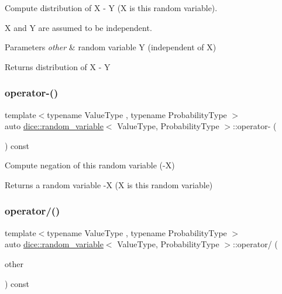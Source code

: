 Compute distribution of X -\/ Y (X is this random variable). 

X and Y are assumed to be independent.


\begin{DoxyParams}{Parameters}
{\em other} & random variable Y (independent of X)\\
\hline
\end{DoxyParams}
\begin{DoxyReturn}{Returns}
distribution of X -\/ Y 
\end{DoxyReturn}
\mbox{\label{classdice_1_1random__variable_a5900675092ca3ca0ea387628ed64624f}} 
\subsubsection{\texorpdfstring{operator-\/()}{operator-()}\hspace{0.1cm}{\footnotesize\ttfamily [2/2]}}
{\footnotesize\ttfamily template$<$typename Value\+Type , typename Probability\+Type $>$ \\
auto \mbox{\hyperlink{classdice_1_1random__variable}{dice\+::random\+\_\+variable}}$<$ Value\+Type, Probability\+Type $>$\+::operator-\/ (\begin{DoxyParamCaption}{ }\end{DoxyParamCaption}) const\hspace{0.3cm}{\ttfamily [inline]}}



Compute negation of this random variable (-\/X) 

\begin{DoxyReturn}{Returns}
a random variable -\/X (X is this random variable) 
\end{DoxyReturn}
\mbox{\label{classdice_1_1random__variable_a52896f8ba19758fc240d6e8f51b650e7}} 
\subsubsection{\texorpdfstring{operator/()}{operator/()}}
{\footnotesize\ttfamily template$<$typename Value\+Type , typename Probability\+Type $>$ \\
auto \mbox{\hyperlink{classdice_1_1random__variable}{dice\+::random\+\_\+variable}}$<$ Value\+Type, Probability\+Type $>$\+::operator/ (\begin{DoxyParamCaption}\item[{const \mbox{\hyperlink{classdice_1_1random__variable}{random\+\_\+variable}}$<$ Value\+Type, Probability\+Type $>$ \&}]{other }\end{DoxyParamCaption}) const\hspace{0.3cm}{\ttfamily [inline]}}



